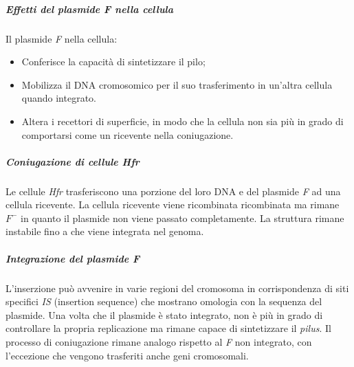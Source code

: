				\subparagraph{Effetti del plasmide \emph{F} nella cellula}
				Il plasmide \emph{F} nella cellula:
				\begin{multicols}{2}
					\begin{itemize}
    						\item Conferisce la capacit\`a di sintetizzare il pilo; 
    						\item Mobilizza il DNA cromosomico per il suo trasferimento in un'altra cellula quando integrato.
    						\item Altera i recettori di superficie, in modo che la cellula non sia più in grado di comportarsi come un ricevente nella coniugazione. 
					\end{itemize}
				\end{multicols}

				\subparagraph{Coniugazione di cellule \emph{Hfr}}
				Le cellule \emph{Hfr} trasferiscono una porzione del loro DNA e del plasmide \emph{F} ad una cellula ricevente.
				La cellula ricevente viene ricombinata ricombinata ma rimane \emph{$F^{-}$} in quanto il plasmide non viene passato completamente.
				La struttura rimane instabile fino a che viene integrata nel genoma.

				\subparagraph{Integrazione del plasmide F}
				L'inserzione può avvenire in varie regioni del cromosoma in corrispondenza di siti specifici \emph{IS} (insertion sequence) che mostrano omologia con la sequenza del plasmide. 
				Una volta che il plasmide è stato integrato, non è più in grado di controllare la propria replicazione ma rimane capace di sintetizzare il \emph{pilus}. 
       				Il processo di coniugazione rimane analogo rispetto al \emph{F} non integrato, con l'eccezione che vengono trasferiti anche geni cromosomali.

